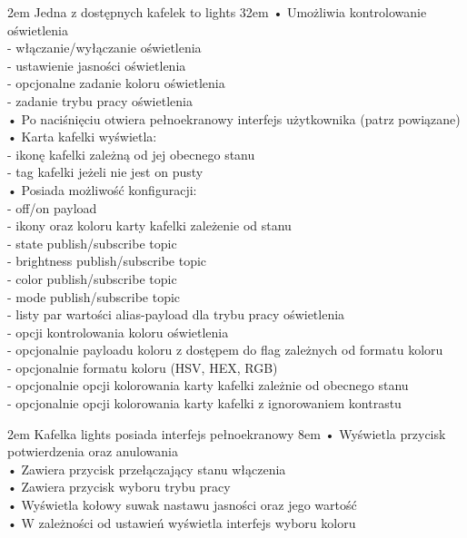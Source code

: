 {2em}{
    Jedna z dostępnych kafelek to lights
}
{32em}{
    • Umożliwia kontrolowanie oświetlenia\\
    - włączanie/wyłączanie oświetlenia\\
    - ustawienie jasności oświetlenia\\
    - opcjonalne zadanie koloru oświetlenia\\
    - zadanie trybu pracy oświetlenia\\

    • Po naciśnięciu otwiera pełnoekranowy interfejs użytkownika (patrz powiązane)\\

    • Karta kafelki wyświetla:\\
    - ikonę kafelki zależną od jej obecnego stanu\\
    - tag kafelki jeżeli nie jest on pusty\\

    • Posiada możliwość konfiguracji:\\
    - off/on payload\\
    - ikony oraz koloru karty kafelki zależenie od stanu\\
    - state publish/subscribe topic\\
    - brightness publish/subscribe topic\\
    - color publish/subscribe topic\\
    - mode publish/subscribe topic\\
    - listy par wartości alias-payload dla trybu pracy oświetlenia\\
    - opcji kontrolowania koloru oświetlenia\\
    - opcjonalnie payloadu koloru z dostępem do flag zależnych od formatu koloru\\
    - opcjonalnie formatu koloru (HSV, HEX, RGB)\\
    - opcjonalnie opcji kolorowania karty kafelki zależnie od obecnego stanu\\
    - opcjonalnie opcji kolorowania karty kafelki z ignorowaniem kontrastu
}

{2em}{
    Kafelka lights posiada interfejs pełnoekranowy}
{8em}{
    • Wyświetla przycisk potwierdzenia oraz anulowania\\
    • Zawiera przycisk przełączający stanu włączenia\\
    • Zawiera przycisk wyboru trybu pracy\\
    • Wyświetla kołowy suwak nastawu jasności oraz jego wartość\\
    • W zależności od ustawień wyświetla interfejs wyboru koloru
}

